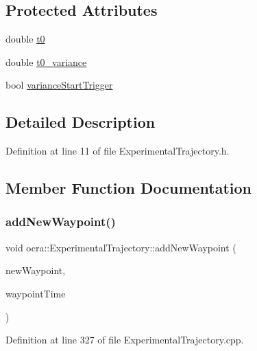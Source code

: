 \subsection*{Protected Attributes}
\begin{DoxyCompactItemize}
\item 
double \hyperlink{classocra_1_1ExperimentalTrajectory_a56b5a0d236891f5087b81cda85aae0be}{t0}
\item 
double \hyperlink{classocra_1_1ExperimentalTrajectory_a90502f229cbccfd19bd884d7b87f734d}{t0\+\_\+variance}
\item 
bool \hyperlink{classocra_1_1ExperimentalTrajectory_ab10b037615b07e20b0d6f81c48b7fd23}{variance\+Start\+Trigger}
\end{DoxyCompactItemize}


\subsection{Detailed Description}


Definition at line 11 of file Experimental\+Trajectory.\+h.



\subsection{Member Function Documentation}
\hypertarget{classocra_1_1ExperimentalTrajectory_a5bd433112f5712a77e857636ed2dd11b}{}\label{classocra_1_1ExperimentalTrajectory_a5bd433112f5712a77e857636ed2dd11b} 
\subsubsection{\texorpdfstring{add\+New\+Waypoint()}{addNewWaypoint()}}
{\footnotesize\ttfamily void ocra\+::\+Experimental\+Trajectory\+::add\+New\+Waypoint (\begin{DoxyParamCaption}\item[{Eigen\+::\+Vector\+Xd}]{new\+Waypoint,  }\item[{double}]{waypoint\+Time }\end{DoxyParamCaption})}



Definition at line 327 of file Experimental\+Trajectory.\+cpp.

